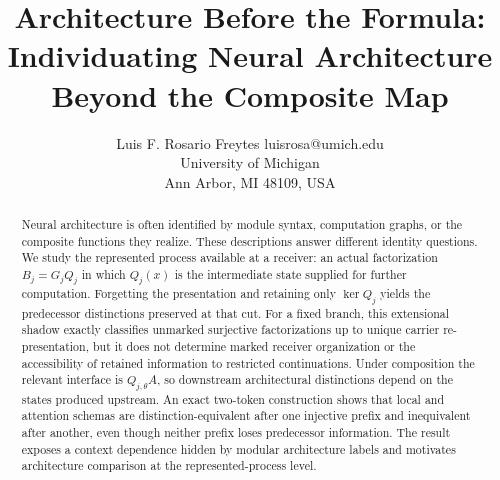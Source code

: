 





\title{Architecture Before the Formula: Individuating Neural Architecture Beyond the Composite Map}

\author{\name Luis F. Rosario Freytes \email luisrosa@umich.edu \\
       \addr University of Michigan\\
       Ann Arbor, MI 48109, USA}

\maketitle

\begin{abstract}
Neural architecture is often identified by module syntax, computation graphs, or the composite functions they realize. These descriptions answer different identity questions. We study the represented process available at a receiver: an actual factorization $B_j=G_jQ_j$ in which $Q_j(x)$ is the intermediate state supplied for further computation. Forgetting the presentation and retaining only $\ker Q_j$ yields the predecessor distinctions preserved at that cut. For a fixed branch, this extensional shadow exactly classifies unmarked surjective factorizations up to unique carrier re-presentation, but it does not determine marked receiver organization or the accessibility of retained information to restricted continuations. Under composition the relevant interface is $Q_{j,\theta}A$, so downstream architectural distinctions depend on the states produced upstream. An exact two-token construction shows that local and attention schemas are distinction-equivalent after one injective prefix and inequivalent after another, even though neither prefix loses predecessor information. The result exposes a context dependence hidden by modular architecture labels and motivates architecture comparison at the represented-process level.
\end{abstract}

